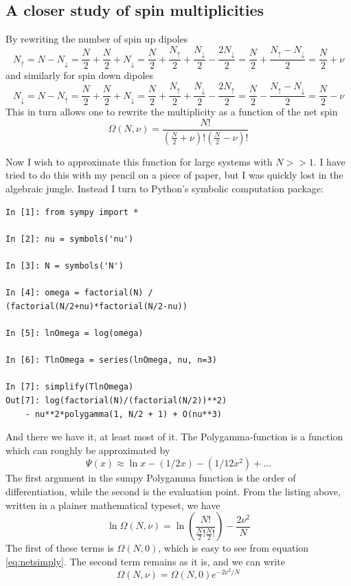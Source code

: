 \documentclass[10pt,a4paper]{amsart}
\begin{document}
\subsection{A closer study of spin multiplicities}
By rewriting the number of spin up dipoles
\begin{equation}
N_{\uparrow}=N-N_{\downarrow}=\frac{N}{2}+\frac{N}{2}+N_{\downarrow}
=\frac{N}{2}+\frac{N_{\uparrow}}{2}+\frac{N_{\downarrow}}{2}-\frac{2N_{\downarrow}}{2}=\frac{N}{2}+\frac{N_{\uparrow}-N_{\downarrow}}{2}=\frac{N}{2}+\nu
\end{equation}
and similarly for spin down dipoles
\begin{equation}
N_{\downarrow}=N-N_{\uparrow}=\frac{N}{2}+\frac{N}{2}+N_{\downarrow}
=\frac{N}{2}+\frac{N_{\uparrow}}{2}+\frac{N_{\downarrow}}{2}-\frac{2N_{\uparrow}}{2}=\frac{N}{2}-\frac{N_{\uparrow}-N_{\downarrow}}{2}=\frac{N}{2}-\nu
\end{equation}
This in turn allows one to rewrite the multiplicity as a function of the net spin
\begin{equation}
\label{eq:netsimply}
\Omega (N,\nu) = \frac{N!}{\left(\frac{N}{2} +\nu\right)!\left(\frac{N}{2} -\nu\right)!}
\end{equation}

Now I wish to approximate this function for large systems with $N>>1$. I have tried to do this with my pencil on a piece of paper, but I was quickly lost in the algebraic jungle. Instead I turn to Python's symbolic computation package:
\begin{lstlisting}
In [1]: from sympy import *

In [2]: nu = symbols('nu')

In [3]: N = symbols('N')

In [4]: omega = factorial(N) / 
(factorial(N/2+nu)*factorial(N/2-nu))

In [5]: lnOmega = log(omega)

In [6]: TlnOmega = series(lnOmega, nu, n=3)

In [7]: simplify(TlnOmega)
Out[7]: log(factorial(N)/(factorial(N/2))**2) 
	- nu**2*polygamma(1, N/2 + 1) + O(nu**3)
\end{lstlisting}
And there we have it, at least most of it. The Polygamma-function is a function which can roughly be approximated by
\begin{equation}
\Psi(x) \approx \ln x -(1/2x) - (1/12x^2) + \dots
\end{equation}
The first argument in the sumpy Polygamma function is the order of differentiation, while the second is the evaluation point. From the listing above, written in a plainer mathematical typeset, we have
\begin{equation}
\ln \Omega(N,\nu)= \ln \left( \frac{N!}{\frac{N}{2}!\frac{N}{2}!} \right) - \frac{2\nu^2}{N}
\end{equation}
The first of these terms is $\Omega(N,0)$, which is easy to see from equation \ref{eq:netsimply}. The second term remains as it is, and we can write
\begin{equation}
\label{eq:omegazero}
\Omega(N,\nu)=\Omega(N,0)e^{-2\nu^2/N}
\end{equation}
\end{document}
